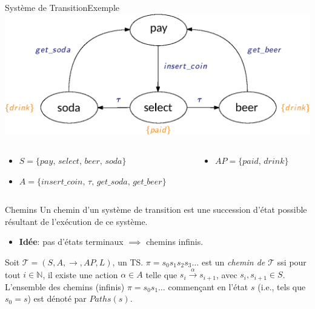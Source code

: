 \documentclass[compress]{beamer}
\begin{document}
\begin{frame}{Système de Transition}{Exemple}
    \includegraphics[width=\linewidth]{resources/TS.eps}
    \scriptsize
    \begin{columns}
      \begin{column}{0.65\textwidth}
        \begin{itemize}
          \item $ S = \{ pay, \, select, \, beer, \, soda \}$
          \item $ A = \{ insert\_coin,\, \tau,\, get\_soda,\, get\_beer\}$
        \end{itemize}
      \end{column}
      \begin{column}{0.35\textwidth}
        \begin{itemize}
          \item $AP = \{ paid, \, drink \}$
        \end{itemize}
      \end{column}
    \end{columns}
\end{frame}

\begin{frame}{Chemins}
Un chemin d'un système de transition est une succession d'état possible résultant de l'exécution de ce système.
\begin{itemize}
  \item \textbf{\color{fibeamer@orange}Idée}: pas d'états terminaux $\implies$
    chemins infinis.
\end{itemize}
\begin{definition}[Chemin d'un TS]
  Soit $\mathcal{T} = (S, A, \rightarrow, AP, L)$, un TS.
  $\pi = s_0 s_1 s_2 s_3 \dots$ est un \textit{chemin de $\mathcal{T}$} ssi
  pour tout $i \in \mathbb{N}$, il existe une action $\alpha \in A$ telle que
  $s_i \xrightarrow{\alpha} s_{i+1}$, avec $s_i, s_{i+1} \in S$. \\
  L'ensemble des chemins (infinis) $\pi = s_0s_1\dots$ commençant en l'état $s$ (i.e., tels que $s_0 = s$) est dénoté par $Paths(s)$.

\end{definition}

\end{frame}
\end{document}

